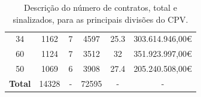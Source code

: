 \begin{table}[H]
{\begin{tabular}{cccccc}
			34                   & 1162                                                                                & 7           & 4597                                                                          & 25.3        & 303.614.946,00€                                                           \\
			60                   & 1124                                                                                & 7           & 3512                                                                          & 32          & 351.923.997,00€                                                           \\
			50                   & 1069                                                                                & 6           & 3908                                                                          & 27.4        & 205.240.508,00€                                                           \\ \midrule
			\textbf{Total}       & 14328                                                                               & -           & 72595                                                                         & -           & -                                                                         \\ \hline
		\end{tabular}%
	}
	\caption{Descrição do número de contratos, total e sinalizados, para as principais divisões do CPV.}
	\label{tab:rf18stats}
\end{table}


